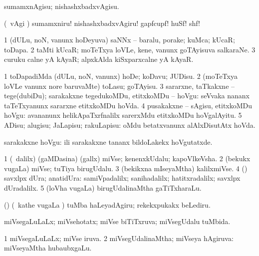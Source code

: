 {{{{{{\noindent
\gl{\sakirx}
\expl{}
\bmng
sumamxnAgisu; nishashxbadxvAgisu. 
\emng

\noindent 
\gl{\akirx}
\expl{}
\bmng
(\kanmu\ \BAavayx vAgi \parx) sumamxniru! nishashxbadxvAgiru! gapfcupf! huSf! shf! 
\emng
\eentry

\bentry
{} 
\gl{\nA}
\expl{}
\bmng
\bnum
\num{1} (dULu, noN, \mo vanunx hoDeyuva) saNNx -- baralu, porake; kuMca; kUcaR; toDapa. 
\num{2} taMti kUcaR; moTeTxya loVLe, kene, \mo vanunx goTAyisuva salkaraNe. 
\num{3} curuku calne yA kAyaR; alpxkAlda kiSxparxcalne yA kAyaR. 
\enum
\emng
\eentry

\bentry
{} 
\gl{\sakirx}
\expl{}
\bmng
\bnum
\num{1} toDapadiMda (dULu, noN, \mo vanunx) hoDe; koDavu; JUDisu. 
\num{2} (moTeTxya loVLe \mo vanunx nore baruvaMte) toLasu; goTAyisu. 
\num{3} sararxne, taTkakxne -- tege(dubiDu); sarakakxne tegedukoMDu, etitxkoMDu -- hoVgu:  seVvaka nananx taTeTxyanunx sararxne etitxkoMDu hoVda. 
\num{4} pusakakxne -- sAgisu, etitxkoMDu hoVgu:  avananunx helikApaTxrfnalilx sarerxMdu etitxkoMDu hoVgalAyitu. 
\num{5} ADisu; alugisu; JaLapisu; rakuLapisu:  oMdu betatxvanunx alAlxDisutAtx hoVda. 
\enum
\emng

\noindent
\gl{\akirx}
\expl{}
\bmng
sarakakxne hoVgu:  ili sarakakxne tananx bildoLakekx hoVgutatxde. 
\emng
\eentry

\bentry
{} 
\gl{\nA}
\expl{}
\bmng
\bnum
\num{1} (\sA\ \bava dalilx) (gaMDasina) (gallx) miVse; kenenxkUdalu; kapoVlkeVsha. 
\num{2} (bekukx \mo vugaLa) miVse; tuTiya birugUdalu. 
\num{3} (bekikxna mIseyaMtha) kalilxmiVse. 
\num{4} (\AmA) savxlpx dUra; anatidUra:  samiVpadalilx; sanihadalilx; hatitxradalilx; savxlpx dUradalilx. 
\num{5} (loVha \mo vugaLa) birugUdalinaMtha gaTiTxharaLu. 
\enum
\emng

\noindent
\gl{\pagu}
\expl{}
\bmng
{} (\AmA) (\kanmu\ kathe \mo vugaLa \vi) tuMba haLeyadAgiru; rekekxpukakx beLediru. 
\emng
\eentry

\bentry
{} 
\gl{\gu}
\expl{}
\bmng
miVsegaLuLaLx; miVsehotatx; miVse biTiTxruva; miVsegUdalu tuMbida. 
\emng
\eentry

\bentry
{} 
\gl{\gu}
\expl{}
\bmng
\bnum
\num{1} miVsegaLuLaLx; miVse iruva. 
\num{2} miVsegUdalinaMtha; miVseya hAgiruva:  miVseyaMtha hubaubxgaLu. 
\enum
\emng
\eentry

}}}}}}
